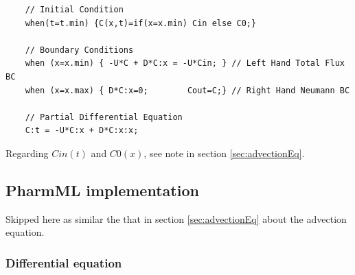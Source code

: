 \lstset{language=MLX}
\begin{lstlisting}
	// Initial Condition
	when(t=t.min) {C(x,t)=if(x=x.min) Cin else C0;}

	// Boundary Conditions
	when (x=x.min) { -U*C + D*C:x = -U*Cin; } // Left Hand Total Flux BC
	when (x=x.max) { D*C:x=0;        Cout=C;} // Right Hand Neumann BC

	// Partial Differential Equation
	C:t = -U*C:x + D*C:x:x;
\end{lstlisting}
Regarding $Cin(t)$ and $C0(x)$, see note in section \ref{sec:advectionEq}.


\bigskip
\subsection*{PharmML implementation}
Skipped here as similar the that in section \ref{sec:advectionEq} about the 
advection equation.

\bigskip

\subsubsection*{Differential equation}

